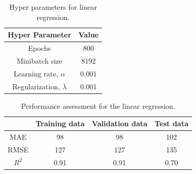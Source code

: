 \begin{table}[h]
    \centering
    {
    \begin{tabular}{ c | c}
        Hyper Parameter                  &  Value       \\
        \hline
        Epochs                           &  800      \\
        Minibatch size                   &  8192     \\
        Learning rate, $\alpha$          &  0.001    \\
        Regularization, $\lambda$          &  0.001  \\
    \end{tabular}}
    \caption{Hyper parameters for linear regression.}
    \label{tab:02LinearHP}
\end{table}
\begin{table}[h]
    \centering
    {
    \begin{tabular}{ c | c | c | c}
                             &  Training data    &  Validation data   &    Test data      \\
        \hline
        MAE                  &  98               &    98              &  102     \\
        RMSE                 &  127              &   127              &  135    \\ 
        $R^2$                &  0.91             &   0.91             &  0.70   \\
    \end{tabular}}
    \caption{Performance assessment for the linear regression.}
    \label{tab:02LinearPE}
\end{table}

